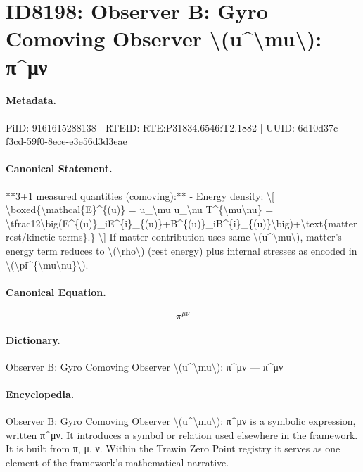 \section*{ID8198: Observer B: Gyro Comoving Observer \textbackslash{}(u\textasciicircum{}\textbackslash{}mu\textbackslash{}): π\textasciicircum{}μν}
\paragraph{Metadata.}
PiID: 9161615288138 | RTEID: RTE:P31834.6546:T2.1882 | UUID: 6d10d37c-f3cd-59f0-8ece-e3e56d3d3eae

\paragraph{Canonical Statement.}
**3+1 measured quantities (comoving):** - Energy density: \textbackslash{}[ \textbackslash{}boxed\{\textbackslash{}mathcal\{E\}\textasciicircum{}\{(u)\} = u\_\textbackslash{}mu u\_\textbackslash{}nu T\textasciicircum{}\{\textbackslash{}mu\textbackslash{}nu\} = \textbackslash{}tfrac12\textbackslash{}big(E\textasciicircum{}\{(u)\}\_iE\textasciicircum{}\{i\}\_\{(u)\}+B\textasciicircum{}\{(u)\}\_iB\textasciicircum{}\{i\}\_\{(u)\}\textbackslash{}big)+\textbackslash{}text\{matter rest/kinetic terms\}.\} \textbackslash{}] If matter contribution uses same \textbackslash{}(u\textasciicircum{}\textbackslash{}mu\textbackslash{}), matter's energy term reduces to \textbackslash{}(\textbackslash{}rho\textbackslash{}) (rest energy) plus internal stresses as encoded in \textbackslash{}(\textbackslash{}pi\textasciicircum{}\{\textbackslash{}mu\textbackslash{}nu\}\textbackslash{}).

\paragraph{Canonical Equation.}
\[
\pi^{\mu\nu}
\]

\paragraph{Dictionary.}
Observer B: Gyro Comoving Observer \textbackslash{}(u\textasciicircum{}\textbackslash{}mu\textbackslash{}): π\textasciicircum{}μν — π\textasciicircum{}μν

\paragraph{Encyclopedia.}
Observer B: Gyro Comoving Observer \textbackslash{}(u\textasciicircum{}\textbackslash{}mu\textbackslash{}): π\textasciicircum{}μν is a symbolic expression, written π\textasciicircum{}μν. It introduces a symbol or relation used elsewhere in the framework. It is built from π, μ, ν. Within the Trawin Zero Point registry it serves as one element of the framework's mathematical narrative.

